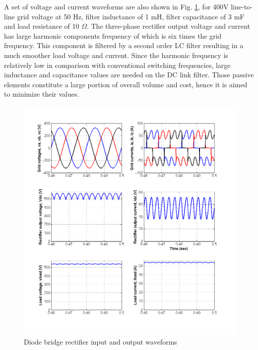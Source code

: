 A set of voltage and current waveforms are also shown in Fig. \ref{fig:rect_waveform}, for 400V line-to-line grid voltage at 50 Hz, filter inductance of 1 mH, filter capacitance of 3 mF and load resistance of 
10 $\Omega$. The three-phase rectifier output voltage and current has large harmonic components frequency of which is six times the grid frequency. This component is filtered by a second order LC filter resulting in a much smoother load voltage and current. Since the harmonic frequency is relatively low in comparison with conventional switching frequencies, large inductance and capacitance values are needed on the DC link filter. Those passive elements constitute a large portion of overall volume and cost, hence it is aimed to minimize their values.

\begin{figure}[htp]
  \centering
  \includegraphics[width=15cm]{images/rect_waveform}
  \caption{Diode bridge rectifier input and output waveforms}
  \label{fig:rect_waveform}
\end{figure}






%   

